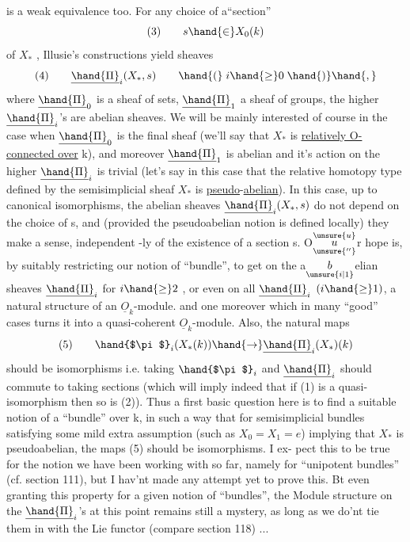is a weak equivalence too. 
For any choice of a``section''
\[ (3) \qquad s \hand{\in} X_0(k) \]
of $X_*$ , Illusie's constructions yield sheaves
\[ (4) \qquad \underline{\hand{\Pi}}_i(X_*,s) \qquad \hand{(} \; i \hand{\geq} 0 \; \hand{)}\hand{,} \]
where $\underline{\hand{\Pi}}_0$ is a sheaf of sets, $\underline{\hand{\Pi}}_1$ a sheaf of groups,   the higher
$\underline{\hand{\Pi}}_i$'s  are abelian sheaves. We will be mainly interested of course in the
case when $\underline{\hand{\Pi}}_0$ is the final sheaf (we'll say that $X_*$ is \uline{relatively O-}
\uline{connected over} k), and moreover $\underline{\hand{\Pi}}_1$ is abelian and it's action on
the higher $\underline{\hand{\Pi}}_i$ is trivial (let's say in this case that the relative
homotopy type defined by the semisimplicial sheaf $X_*$ is \uline{pseudo}-\uline{abelian}).
In this case, up to canonical isomorphisms, the  abelian
sheaves $\underline{\hand{\Pi}}_i(X_*,s)$ do not depend on the choice of s, and (provided the
pseudoabelian notion is defined locally) they make a sense, independent%
-ly  of the existence  of a section s. O$\overset{\unsure{u}}{\underset{\unsure{''}}{u}}$r hope is, by suitably
restricting our notion of ``bundle'', to get on the a$\underset{\unsure{i|1}}{b}$elian sheaves $\underline{\hand{\Pi}}_i$
for $i \hand{\geq} 2$ , or even on all $\underline{\hand{\Pi}}_i$ $(i \hand{\geq} 1)$, a natural structure of an
$\underline{O}_k$-module.  and one moreover which in many ``good'' cases turns it
into a quasi-coherent $\underline{O}_k$-module. Also, the natural maps
\[ (5) \qquad \hand{$\pi$}_i(X_*(k)) \hand{\to} \underline{\hand{\Pi}}_i(X_*)(k) \]
should be isomorphisms\hand{,} i.e. taking $\hand{$\pi$}_i$ and $\underline{\hand{\Pi}}_i$ should commute to taking
sections (which will imply indeed that if (1) is a quasi-isomorphism
then so is (2)). Thus a first basic question here is to find a suitable
notion of a ``bundle'' over k, in such a way that for semisimplicial
bundles satisfying some mild extra assumption (such as $X_0=X_1=e$) implying
that $X_*$ is pseudoabelian, the maps (5) should be isomorphisms. I ex-%
pect this to be true for the notion we have been working with so far,
namely for ``unipotent bundles'' (cf. section 111), but I hav'nt made
any attempt yet to prove this. Bt even granting this property for
a given notion of ``bundles'', the Module structure on the $\underline{\hand{\Pi}}_i$'s at this
point remains still a mystery,\unsure{\hand{$^*$}} as long as we do'nt tie them in with the
Lie functor (compare section 118) ...

